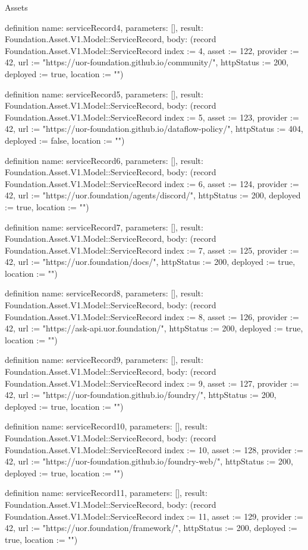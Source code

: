 \begin{lexlean}{Assets}
\begin{semanticmodule}
definition{
  name: serviceRecord4,
  parameters: [],
  result: Foundation.Asset.V1.Model::ServiceRecord,
  body: (record Foundation.Asset.V1.Model::ServiceRecord {index := 4, asset := 122, provider := 42, url := "https://uor-foundation.github.io/community/", httpStatus := 200, deployed := true, location := ""})
}

definition{
  name: serviceRecord5,
  parameters: [],
  result: Foundation.Asset.V1.Model::ServiceRecord,
  body: (record Foundation.Asset.V1.Model::ServiceRecord {index := 5, asset := 123, provider := 42, url := "https://uor-foundation.github.io/dataflow-policy/", httpStatus := 404, deployed := false, location := ""})
}

definition{
  name: serviceRecord6,
  parameters: [],
  result: Foundation.Asset.V1.Model::ServiceRecord,
  body: (record Foundation.Asset.V1.Model::ServiceRecord {index := 6, asset := 124, provider := 42, url := "https://uor.foundation/agents/discord/", httpStatus := 200, deployed := true, location := ""})
}

definition{
  name: serviceRecord7,
  parameters: [],
  result: Foundation.Asset.V1.Model::ServiceRecord,
  body: (record Foundation.Asset.V1.Model::ServiceRecord {index := 7, asset := 125, provider := 42, url := "https://uor.foundation/docs/", httpStatus := 200, deployed := true, location := ""})
}

definition{
  name: serviceRecord8,
  parameters: [],
  result: Foundation.Asset.V1.Model::ServiceRecord,
  body: (record Foundation.Asset.V1.Model::ServiceRecord {index := 8, asset := 126, provider := 42, url := "https://ask-api.uor.foundation/", httpStatus := 200, deployed := true, location := ""})
}

definition{
  name: serviceRecord9,
  parameters: [],
  result: Foundation.Asset.V1.Model::ServiceRecord,
  body: (record Foundation.Asset.V1.Model::ServiceRecord {index := 9, asset := 127, provider := 42, url := "https://uor-foundation.github.io/foundry/", httpStatus := 200, deployed := true, location := ""})
}

definition{
  name: serviceRecord10,
  parameters: [],
  result: Foundation.Asset.V1.Model::ServiceRecord,
  body: (record Foundation.Asset.V1.Model::ServiceRecord {index := 10, asset := 128, provider := 42, url := "https://uor-foundation.github.io/foundry-web/", httpStatus := 200, deployed := true, location := ""})
}

definition{
  name: serviceRecord11,
  parameters: [],
  result: Foundation.Asset.V1.Model::ServiceRecord,
  body: (record Foundation.Asset.V1.Model::ServiceRecord {index := 11, asset := 129, provider := 42, url := "https://uor.foundation/framework/", httpStatus := 200, deployed := true, location := ""})
}


\end{semanticmodule}
\end{lexlean}
